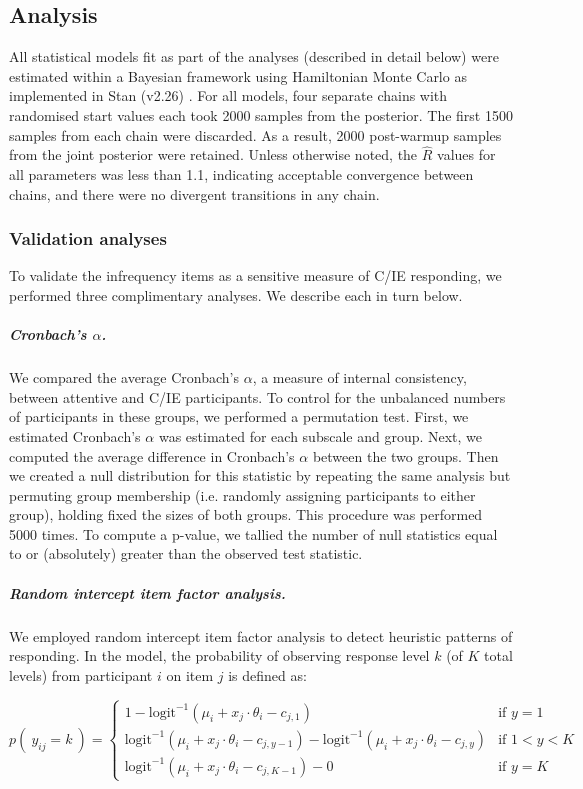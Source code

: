 \documentclass[a4paper,notitlepage,12pt]{article}
\begin{document}
\begin{refsection}[main]
\subsection{Analysis}

All statistical models fit as part of the analyses (described in detail below) were estimated within a Bayesian framework using Hamiltonian Monte Carlo as implemented in Stan (v2.26) \cite{stan}. For all models, four separate chains with randomised start values each took 2000 samples from the posterior. The first 1500 samples from each chain were discarded. As a result, 2000 post-warmup samples from the joint posterior were retained. Unless otherwise noted, the $\hat{R}$ values for all parameters was less than 1.1, indicating acceptable convergence between chains, and there were no divergent transitions in any chain. 

\subsubsection{Validation analyses}

To validate the infrequency items as a sensitive measure of C/IE responding, we performed three complimentary analyses. We describe each in turn below.

\subparagraph{Cronbach's $\alpha$.} We compared the average Cronbach's $\alpha$, a measure of internal consistency, between attentive and C/IE participants. To control for the unbalanced numbers of participants in these groups, we performed a permutation test. First, we estimated Cronbach's $\alpha$ was estimated for each subscale and group. Next, we computed the average difference in Cronbach's $\alpha$ between the two groups. Then we created a null distribution for this statistic by repeating the same analysis but permuting group membership (i.e. randomly assigning participants to either group), holding fixed the sizes of both groups. This procedure was performed 5000 times. To compute a p-value, we tallied the number of null statistics equal to or (absolutely) greater than the observed test statistic. 

\subparagraph{Random intercept item factor analysis.} We employed random intercept item factor analysis \cite{maydeu2006random} to detect heuristic patterns of responding. In the model, the probability of observing response level $k$ (of $K$ total levels) from participant $i$ on item $j$ is defined as:

\begin{equation*}
    p( \ y_{ij} = k \ ) = \left\{ \begin{array}{ll}
1 - \text{logit}^{-1}( \mu_i + x_j\cdot \theta_i - c_{j,1})  &  \text{if } y = 1 \\[4pt]
\text{logit}^{-1}( \mu_i + x_j\cdot \theta_i - c_{j,y-1}) - \text{logit}^{-1}( \mu_i + x_j\cdot \theta_i - c_{j,y}) & \text{if } 1 < y < K \\[4pt]
\text{logit}^{-1}( \mu_i + x_j\cdot \theta_i - c_{j,K-1}) - 0  &  \text{if } y = K
\end{array} \right.
\end{equation*}


\end{refsection}
\end{document}
